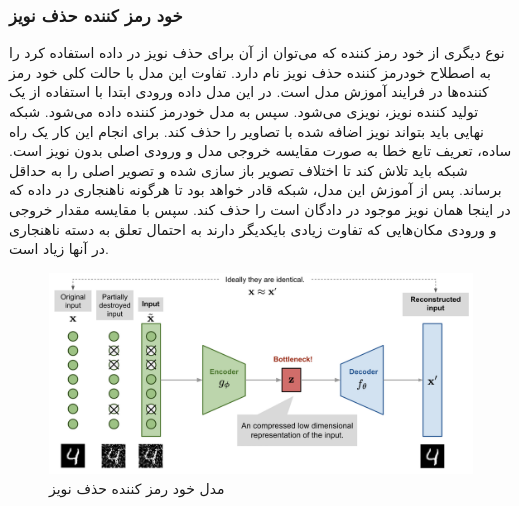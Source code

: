\documentclass[12pt,a4paper]{report}
\begin{document}
\subsubsection{خود رمز کننده حذف نویز}
نوع دیگری از خود رمز کننده که می‌توان از آن برای حذف نویز در داده استفاده کرد را به اصطلاح خودرمز کننده حذف نویز نام دارد. تفاوت این مدل با حالت کلی خود رمز کننده‌ها در فرایند آموزش مدل است. در این مدل داده ورودی ابتدا با استفاده از یک تولید کننده نویز، نویزی می‌شود. سپس به مدل خودرمز کننده داده می‌شود. شبکه نهایی باید بتواند نویز اضافه شده با تصاویر را حذف کند. برای انجام این کار یک راه ساده، تعریف تابع خطا به صورت مقایسه خروجی مدل و ورودی اصلی بدون نویز است. شبکه باید تلاش کند تا اختلاف تصویر باز سازی شده و تصویر اصلی را به حداقل برساند. پس از آموزش این مدل، شبکه قادر خواهد بود تا هرگونه ناهنجاری در داده که در اینجا همان نویز موجود در دادگان است را حذف کند. سپس با مقایسه مقدار خروجی و ورودی مکان‌هایی که تفاوت زیادی بایکدیگر دارند به احتمال تعلق به دسته ناهنجاری در آنها زیاد است.

\begin{figure}[!h]
	\begin{center}
		\includegraphics[width=\linewidth]{./images/figures/dae.png}
	\end{center}
	\caption{مدل خود رمز کننده حذف نویز}
	\label{fig:dae}
	\centering
\end{figure}
\end{document}
